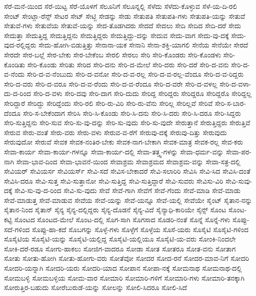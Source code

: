 {ಸೆರೆ-ಮನೆ-ಯಿಂದ
ಸೆರೆ-ಯಿಟ್ಟ
ಸೆರೆ-ಯೊಳಗೆ
ಸೆಲೂನಿಗೆ
ಸೆಲೂನ್ನಲ್ಲಿ
ಸೆಳೆದು
ಸೆಳೆದು-ಕೊಳ್ಳುವ
ಸೆಳೆ-ಯ-ದಿ-ರಲಿ
ಸೇಂಟ್
ಸೇಂಟ್ಲಾ-ರೆನ್ಸ್
ಸೇಟರ
ಸೇಟ್
ಸೇಟ್ಜಿ
ಸೇಡನ್ನು
ಸೇಡು
ಸೇತುಪತಿ
ಸೇತುಪತಿ-ಗಳು
ಸೇತುಪತಿ-ಯನ್ನು
ಸೇತುವೆ
ಸೇತುವೆ-ಗಳು
ಸೇತುವೆಯ
ಸೇತುವೆ-ಯನ್ನು
ಸೇದ-ತೊಡಗಿದರು
ಸೇದದೆ
ಸೇದಲು
ಸೇದಿ
ಸೇದಿದ
ಸೇದಿ-ದರೆ
ಸೇದು
ಸೇದುತ್ತಾ
ಸೇದುತ್ತಿದ್ದ
ಸೇದುತ್ತಿದ್ದನು
ಸೇದುತ್ತಿದ್ದರು
ಸೇದುತ್ತಿದ್ದು-ದನ್ನು
ಸೇದುವ
ಸೇದು-ವಾಗ
ಸೇದು-ವು-ದಕ್ಕೆ
ಸೇದು-ವುದ-ರಲ್ಲಿದ್ದರು
ಸೇದು-ಹೋಗಿ-ಬಿಡುತ್ತಿತ್ತು
ಸೇನಾನಾ-ಯಕ
ಸೇನಾನಿ
ಸೇನಾ-ಶಕ್ತಿ-ಯಾಗಲಿ
ಸೇನೆಯ
ಸೇನೆಯೇ
ಸೇರದೆ
ಸೇರದೇ
ಸೇರ-ಬಲ್ಲೆ
ಸೇರ-ಬೇಕು
ಸೇರ-ಬೇಕೆಂಬ
ಸೇರಲಿ
ಸೇರಲು
ಸೇರಿ
ಸೇರಿ-ಕೊಂಡರು
ಸೇರಿ-ಕೊಂಡಳು
ಸೇರಿ-ಕೊಂಡಿತು
ಸೇರಿ-ಕೊಂಡು
ಸೇರಿತು
ಸೇರಿದ
ಸೇರಿ-ದನು
ಸೇರಿ-ದ-ಮೇಲೆ
ಸೇರಿ-ದರು
ಸೇರಿ-ದರೆ
ಸೇರಿ-ದ-ವನು
ಸೇರಿ-ದ-ವ-ನೆಂದು
ಸೇರಿ-ದ-ವ-ನೆಂಬುದು
ಸೇರಿ-ದ-ವನೋ
ಸೇರಿ-ದ-ವ-ರಲ್ಲ
ಸೇರಿ-ದ-ವ-ರಲ್ಲ-ವೆಂದೂ
ಸೇರಿ-ದ-ವ-ರಿದ್ದರು
ಸೇರಿ-ದ-ವರು
ಸೇರಿ-ದ-ವರೂ
ಸೇರಿ-ದ-ವ-ರೆಂದು
ಸೇರಿ-ದ-ವ-ರೆಂದೂ
ಸೇರಿ-ದ-ವರೇ
ಸೇರಿ-ದ-ವಳಲ್ಲ
ಸೇರಿ-ದ-ವಳಾ-ದು-ದ-ರಿಂದ
ಸೇರಿ-ದ-ವಳು
ಸೇರಿ-ದವು
ಸೇರಿ-ದಾಗ
ಸೇರಿ-ದುದು
ಸೇರಿದ್ದ
ಸೇರಿದ್ದರು
ಸೇರಿದ್ದರೂ
ಸೇರಿದ್ದರೊ
ಸೇರಿದ್ದಲ್ಲ
ಸೇರಿದ್ದಾರೆ
ಸೇರಿದ್ದು
ಸೇರಿದ್ದೆಂದು
ಸೇರಿ-ರಲಿ
ಸೇರಿ-ರು-ವಿರಿ
ಸೇರಿ-ರು-ವೆನು
ಸೇರಿಲ್ಲ
ಸೇರಿಲ್ಲವೆ
ಸೇರಿವೆ
ಸೇರಿ-ಸ-ಬಾರ-ದೆಂದೂ
ಸೇರಿ-ಸ-ಬೇಕೆಂದಾಗ
ಸೇರಿಸಿ
ಸೇರಿ-ಸಿ-ಕೊಂಡು
ಸೇರಿ-ಸಿ-ದನು
ಸೇರಿ-ಸಿ-ದರು
ಸೇರಿ-ಸಿ-ದರೂ
ಸೇರಿ-ಸಿದ್ದರು
ಸೇರಿ-ಸುತ್ತಿದ್ದನು
ಸೇರಿ-ಸುವ
ಸೇರಿ-ಸು-ವು-ದನ್ನು
ಸೇರಿ-ಸು-ವುದು
ಸೇರಿ-ಸು-ವುದೇ
ಸೇರುತ್ತಾನೆ
ಸೇರುತ್ತಿದ್ದರು
ಸೇರುತ್ತಿವೆ
ಸೇರುವ
ಸೇರು-ವಂತೆ
ಸೇರು-ವರು
ಸೇರು-ವಳು
ಸೇರುವ-ವ-ರೆಗೆ
ಸೇರುವು-ದಕ್ಕೆ
ಸೇರುವು-ದಿತ್ತು
ಸೇರುವುದು
ಸೇರುವುದೋ
ಸೇರುವೆ
ಸೇವಕ
ಸೇವಕ-ನಂತಿರ-ಬೇಕು
ಸೇವಕ-ನಾಗ-ಬೇಕಾಗಿ
ಸೇವಕ-ಮಾತ್ರ
ಸೇವಕ-ರಲ್ಲ
ಸೇವ-ಕರು
ಸೇವಾ-ಕಾರ್ಯ
ಸೇವಾ-ಕಾರ್ಯ-ಗಳನ್ನೂ
ಸೇವಾ-ಕಾರ್ಯ-ದಲ್ಲಿ
ಸೇವಾ-ತತ್ತ್ವ-ಗಳನ್ನು
ಸೇವಾ-ಧರ್ಮ-ವನ್ನು
ಸೇವಾ-ಪರ-ನಾಗಿ
ಸೇವಾ-ಭಾವ-ದಿಂದ
ಸೇವಾ-ಭಾವನೆ-ಯಿಂದ
ಸೇವಾಶ್ರಮ
ಸೇವಾಶ್ರಮದ
ಸೇವಾಶ್ರಮ-ವನ್ನು
ಸೇವಾ-ಸತ್ರ-ದಲ್ಲಿ
ಸೇವಿಯರ್
ಸೇವಿಯರ್ಸ
ಸೇವಿಯರ್ಸ್
ಸೇವಿ-ಸದೆ
ಸೇವಿಸ-ಬೇಕಾದರೆ
ಸೇವಿ-ಸಲಾರಿರಿ
ಸೇವಿಸಿ
ಸೇವಿ-ಸಿದ
ಸೇವಿಸಿ-ದಂತೆ
ಸೇವಿಸಿ-ದರೂ
ಸೇವಿ-ಸುತ್ತ
ಸೇವಿ-ಸುತ್ತಾನೋ
ಸೇವಿ-ಸುತ್ತಿದ್ದ
ಸೇವಿ-ಸುತ್ತಿದ್ದಾರೆ
ಸೇವಿ-ಸುವರು
ಸೇವಿಸು-ವಿರಿ
ಸೇವಿ-ಸುವು-ದಕ್ಕೆ
ಸೇವಿ-ಸು-ವು-ದ-ರಿಂದ
ಸೇವಿ-ಸು-ವುದು
ಸೇವೆ
ಸೇವೆ-ಗಾಗಿ
ಸೇವೆಗೆ
ಸೇವೆ-ಗೆಂದು
ಸೇವೆ-ಮಾಡಿ
ಸೇವೆ-ಮಾಡು
ಸೇವೆ-ಮಾಡುತ್ತ
ಸೇವೆ-ಮಾಡುವ
ಸೇವೆಯ
ಸೇವೆ-ಯನ್ನು
ಸೇವೆ-ಯನ್ನೂ
ಸೇವೆ-ಯಲ್ಲಿ
ಸೇವೆಯೇ
ಸೈಂಟ್
ಸೈತಾನ-ನನ್ನು
ಸೈತಾನ-ನಿಂದ
ಸೈತಾನ್
ಸೈನ್ಯ
ಸೈನ್ಯ-ದಲ್ಲಿದ್ದರು
ಸೈನ್ಯ-ದೊಡನೆ
ಸೈನ್ಯ-ವಿದೆ
ಸೈನ್ಯಾಧಿ-ಕಾರಿಯೇ
ಸೈನ್ಸ್
ಸೊಂಟ
ಸೊಂಟ-ಕಟ್ಟಿ
ಸೊಂಟದ
ಸೊಂಟದ-ಮೇಲೆ
ಸೊಂಟ-ದಲ್ಲಿ
ಸೊಗ-ಸಾಗಿ
ಸೊಗಸಾದ
ಸೊಡರಿ-ನಂತೆ
ಸೊನ್ನೆ
ಸೊನ್ನೆ-ಗಳು
ಸೊಪ್ಪು-ಸದೆ-ಗಳಿಂದ
ಸೊಪ್ಪು-ಹಾ-ಕದೆ
ಸೊಬಗನ್ನು
ಸೊಳ್ಳೆ-ಗಳು
ಸೊಳ್ಳೆಗೆ
ಸೊಳ್ಳೆಯ
ಸೊಸೆ-ಯರು
ಸೊಸೈಟಿ
ಸೊಸೈಟಿ-ಗಳಿಂದ
ಸೊಸೈಟಿಯ
ಸೊಸೈಟಿ-ಯನ್ನು
ಸೊಸೈಟಿ-ಯಲ್ಲಿದ್ದ
ಸೊಸೈಟಿ-ಯಲ್ಲಿಯೂ
ಸೊಸೈಟಿ-ಯ-ವರು
ಸೋಂಕಿ-ನಿಂದಲೇ
ಸೋಕಿ-ದರೆ-ರಡೂ
ಸೋಗು-ಹಾಕಲು
ಸೋಜಿಗ-ವಾದರೂ
ಸೋಡಾ
ಸೋತ
ಸೋತರೂ
ಸೋತ-ವನು
ಸೋತಾಗ
ಸೋತು
ಸೋತು-ಹೋಗಿ
ಸೋತು-ಹೋಗು-ವರು
ಸೋತೆವೋ
ಸೋದರ
ಸೋದ-ರನೆ
ಸೋದರ-ಮಾವ-ನಿಗೆ
ಸೋದರಿ
ಸೋದರಿ-ಯನ್ನಾಗಿ
ಸೋದರಿ-ಯರು
ಸೋದರಿ-ಯಾದ
ಸೋಪಾನ
ಸೋಪಾ-ನಕ್ಕೆ
ಸೋಮನಾಥ
ಸೋಮನಾಥ-ದಲ್ಲಿ
ಸೋಮಬಳ್ಳಿ
ಸೋಮಬಳ್ಳಿಯ
ಸೋಮ-ವಾರ
ಸೋಮಾರಿ
ಸೋಮಾರಿ-ಗಳಿಗೆ
ಸೋಮಾರಿ-ಗಳು
ಸೋಮಾರಿ-ತನಕ್ಕಾಗಿ
ಸೋರುತ್ತಿರ-ಬಹುದು
ಸೋರೆಬುರುಡೆ-ಯನ್ನು
ಸೋಲನ್ನು
ಸೋಲಿ-ಸಿದರೂ
ಸೋಲಿ-ಸಿದೆ
}
